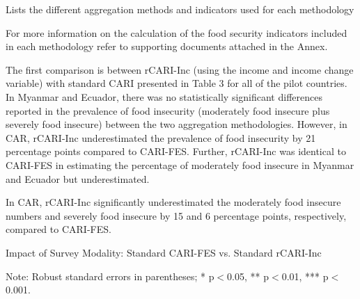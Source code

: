 \documentclass[11pt,harvard]{article}
\begin{document}
	\begin{table}[htbp]
		\centering
		\begin{adjustbox}{max width=\textwidth}
			\begin{threeparttable}
				\caption{Lists the different aggregation methods and indicators used for each methodology}
				\scriptsize
				 
				\label{tab:Aggregation_Table}
			\end{threeparttable}
		\end{adjustbox}
	\end{table}
	
For more information on the calculation of the food security indicators included in each methodology refer to supporting documents attached in the Annex. 
	
The first comparison is between rCARI-Inc  (using the income and income change variable) with standard CARI presented in Table 3 for all of the pilot countries. In Myanmar and Ecuador, there was no statistically significant differences reported in the prevalence of food insecurity (moderately food insecure plus severely food insecure) between the two aggregation methodologies. However, in CAR, rCARI-Inc underestimated the prevalence of food insecurity by 21 percentage points compared to CARI-FES. Further, rCARI-Inc was identical to CARI-FES in estimating the percentage of moderately food insecure in Myanmar and Ecuador but underestimated. 

In CAR, rCARI-Inc significantly underestimated the moderately food insecure numbers and severely food insecure by 15 and 6 percentage points, respectively, compared to CARI-FES.
	
	\begin{table}[htbp]
		\centering
		\begin{adjustbox}{max width=\textwidth}
			\begin{threeparttable}
				\caption{Impact of Survey Modality: Standard CARI-FES vs. Standard rCARI-Inc}
				\scriptsize
				 
				\label{tab:CARI_rCARI_Modality_All_Country}
				\begin{tablenotes}
					\item Note: Robust standard errors in parentheses; * p$<$0.05, ** p$<$0.01, *** p$<$0.001. 
				\end{tablenotes}
			\end{threeparttable}
		\end{adjustbox}
	\end{table}
	
\end{document}
